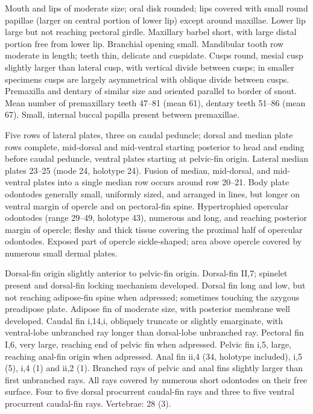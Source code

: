 \documentclass[12pt]{article}
\begin{document}
Mouth and lips of moderate size; oral disk rounded; lips covered with small round papillae (larger on central portion of lower lip) except around maxillae. %
Lower lip large but not reaching pectoral girdle. %
Maxillary barbel short, with large distal portion free from lower lip. %
Branchial opening small. %
Mandibular tooth row moderate in length; teeth thin, delicate and cuspidate. %
Cusps round, mesial cusp slightly larger than lateral cusp, with vertical divide between cusps; in smaller specimens cusps are largely asymmetrical with oblique divide between cusps. %
Premaxilla and dentary of similar size and oriented parallel to border of snout. %
Mean number of premaxillary teeth 47--81 (mean 61), dentary teeth 51--86 (mean 67). %
Small, internal buccal papilla present between premaxillae.%

Five rows of lateral plates, three on caudal peduncle; dorsal and median plate rows complete, mid-dorsal and mid-ventral starting posterior to head and ending before caudal peduncle, ventral plates starting at pelvic-fin origin. %
Lateral median plates 23--25 (mode 24, holotype 24). %
Fusion of median, mid-dorsal, and mid-ventral plates into a single median row occurs around row 20--21. %
Body plate odontodes generally small, uniformly sized, and arranged in lines, but longer on ventral margin of opercle and on pectoral-fin spine. %
Hypertrophied opercular odontodes (range 29--49, holotype 43), numerous and long, and reaching posterior margin of opercle; fleshy and thick tissue covering the proximal half of opercular odontodes. %
Exposed part of opercle sickle-shaped; area above opercle covered by numerous small dermal plates.%

Dorsal-fin origin slightly anterior to pelvic-fin origin. %
Dorsal-fin II,7; spinelet present and dorsal-fin locking mechanism developed. %
Dorsal fin long and low, but not reaching adipose-fin spine when adpressed; sometimes touching the azygous preadipose plate. %
Adipose fin of moderate size, with posterior membrane well developed. %
Caudal fin i,14,i, obliquely truncate or slightly emarginate, with ventral-lobe unbranched ray longer than dorsal-lobe unbranched ray. %
Pectoral fin I,6, very large, reaching end of pelvic fin when adpressed. %
Pelvic fin i,5, large, reaching anal-fin origin when adpressed. %
Anal fin ii,4 (34, holotype included), i,5 (5), i,4 (1) and ii,2 (1). %
Branched rays of pelvic and anal fins slightly larger than first unbranched rays. %
All rays covered by numerous short odontodes on their free surface. %
Four to five dorsal procurrent caudal-fin rays and three to five ventral procurrent caudal-fin rays. Vertebrae: 28 (3).\\%
\bigskip
\end{document}
